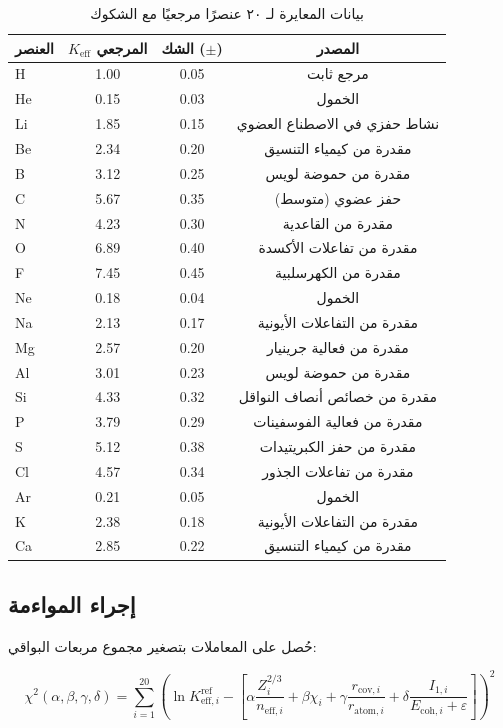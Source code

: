 \documentclass[12pt,a4paper]{article}
\theoremstyle{remark}
\newcommand{\Keff}{K_{\mathrm{eff}}}
\begin{document}
	\begin{table}[htbp]
		\centering
		\caption{بيانات المعايرة لـ ٢٠ عنصرًا مرجعيًا مع الشكوك}
		\label{tab:calibration}
		\begin{tabular}{lccc}
			\toprule
			العنصر & $\Keff$ المرجعي & الشك ($\pm$) & المصدر \\
			\midrule
			H  & 1.00 & 0.05 & مرجع ثابت \\
			He & 0.15 & 0.03 & الخمول \\
			Li & 1.85 & 0.15 & نشاط حفزي في الاصطناع العضوي \\
			Be & 2.34 & 0.20 & مقدرة من كيمياء التنسيق \\
			B  & 3.12 & 0.25 & مقدرة من حموضة لويس \\
			C  & 5.67 & 0.35 & حفز عضوي (متوسط) \\
			N  & 4.23 & 0.30 & مقدرة من القاعدية \\
			O  & 6.89 & 0.40 & مقدرة من تفاعلات الأكسدة \\
			F  & 7.45 & 0.45 & مقدرة من الكهرسلبية \\
			Ne & 0.18 & 0.04 & الخمول \\
			Na & 2.13 & 0.17 & مقدرة من التفاعلات الأيونية \\
			Mg & 2.57 & 0.20 & مقدرة من فعالية جرينيار \\
			Al & 3.01 & 0.23 & مقدرة من حموضة لويس \\
			Si & 4.33 & 0.32 & مقدرة من خصائص أنصاف النواقل \\
			P  & 3.79 & 0.29 & مقدرة من فعالية الفوسفينات \\
			S  & 5.12 & 0.38 & مقدرة من حفز الكبريتيدات \\
			Cl & 4.57 & 0.34 & مقدرة من تفاعلات الجذور \\
			Ar & 0.21 & 0.05 & الخمول \\
			K  & 2.38 & 0.18 & مقدرة من التفاعلات الأيونية \\
			Ca & 2.85 & 0.22 & مقدرة من كيمياء التنسيق \\
			\bottomrule
		\end{tabular}
	\end{table}
	
	\subsection{إجراء المواءمة}
	
	حُصل على المعاملات بتصغير مجموع مربعات البواقي:
	
	\begin{equation}
		\chi^2(\alpha,\beta,\gamma,\delta) = \sum_{i=1}^{20} \left( \ln K_{\mathrm{eff},i}^{\text{ref}} - \left[ \alpha \frac{Z_i^{2/3}}{n_{\text{eff},i}} + \beta \chi_i + \gamma \frac{r_{\text{cov},i}}{r_{\text{atom},i}} + \delta \frac{I_{1,i}}{E_{\text{coh},i} + \varepsilon} \right] \right)^2
		\label{eq:chi2}
	\end{equation}
	
\end{document}
